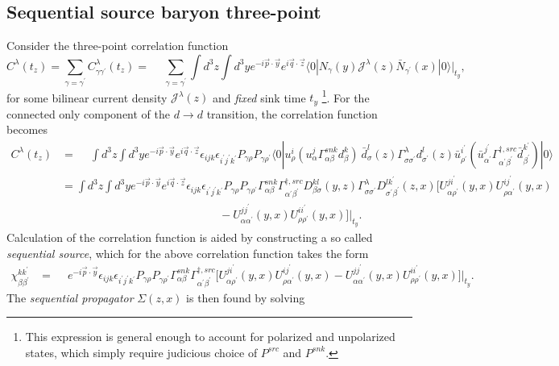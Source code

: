 \documentclass[prd,12pt,superscriptaddress,tightenlines,nofootinbib]{revtex4}
\def\a{{\alpha}}
\def\b{{\beta}}
\def\g{{\gamma}}
\def\G{{\Gamma}}
\def\l{{\lambda}}
\def\s{{\sigma}}
\def\ip{{i^\prime}}
\def\jp{{j^\prime}}
\def\kp{{k^\prime}}
\def\ap{{\alpha^\prime}}
\def\bp{{\beta^\prime}}
\def\gp{{\gamma^\prime}}
\def\rp{{\rho^\prime}}
\def\sp{{\sigma^\prime}}
\begin{document}
\subsection{Sequential source baryon three-point}

Consider the three-point correlation function 
\begin{equation}
C^\l (t_z) = \sum_{\g = \gp}C^\l_{\g\gp} (t_z) = \phantom{-} \sum_{\g = \gp} \int d^3 z \int d^3 y  e^{- i \vec{p} \cdot \vec{y}} e^{i \vec{q} \cdot \vec{z}} \langle 0| N_{\g} (y) \mathcal{J}^{\l}(z) \bar{N}_{\gp}(x) |0\rangle \Big|_{t_y},
\end{equation}
for some bilinear current density $\mathcal{J}^{\l}(z)$ and \emph{fixed} sink time $t_y$ \footnote{This expression is general enough to account for polarized and unpolarized states, which simply require judicious choice of $P^{src}$ and $P^{snk}$. }. For the connected only component of the $d \rightarrow d$ transition, the correlation function becomes
\begin{align}
C^\l (t_z) &= \phantom{-} \int d^3 z \int d^3 y  e^{- i \vec{p} \cdot \vec{y}} e^{i \vec{q} \cdot \vec{z}} \epsilon_{ijk} \epsilon_{\ip\jp\kp} P_{\g\rho} P_{\g\rp} 
	\langle 0| 
		u^i_\rho (u^j_\a \G^{snk}_{\a\b} d^k_\b ) \ 
		\bar{d}^l_\s(z) \G^\l_{\s\sp} d^l_{\sp}(z)
		\bar{u}^\ip_\rp (\bar{u}^{\jp}_{\ap} \G^{\dagger,src}_{\ap\bp} \bar{d}^\kp_\bp ) 
	|0\rangle
\nonumber\\&= 
\int d^3 z \int d^3 y  e^{- i \vec{p} \cdot \vec{y}} e^{i \vec{q} \cdot \vec{z}} \epsilon_{ijk} \epsilon_{\ip\jp\kp} P_{\g\rho} P_{\g\rp}  \G^{snk}_{\a\b}  \G^{\dagger,src}_{\ap\bp}
     D^{kl}_{\b\s}(y,z)\G^\l_{\s\sp} D^{l \kp}_{\sp\bp}(z,x)
     \Big[
     U^{j\ip}_{\a\rp}(y,x)U^{i\jp}_{\rho\ap}(y,x)
\nonumber\\&\qquad\qquad\qquad\qquad\qquad\qquad\qquad
     - U^{j\jp}_{\a\ap}(y,x)U^{i\ip}_{\rho\rp}(y,x)
     \Big]\Big|_{t_y}.
\end{align}
Calculation of the correlation function is aided by constructing a so called \emph{sequential source}, which for the above correlation function takes the form
\begin{align}
\chi^{ k\kp}_{\b\bp} &= \phantom{-}  e^{- i \vec{p} \cdot \vec{y}}  \epsilon_{ijk} \epsilon_{\ip\jp\kp} P_{\g\rho} P_{\g\rp} \G^{snk}_{\a\b} \G^{\dagger,src}_{\ap\bp}   
  \Big[
     U^{j\ip}_{\a\rp}(y,x)U^{i\jp}_{\rho\ap}(y,x)
     - U^{j\jp}_{\a\ap}(y,x)U^{i\ip}_{\rho\rp}(y,x)
     \Big]\Big|_{t_y}.
\end{align}
The \emph{sequential propagator} $\Sigma(z,x)$ is then found by solving
\end{document}
